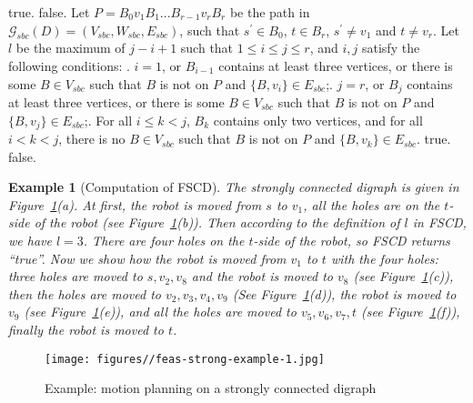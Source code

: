 \documentclass{article}
\newtheorem{exmp}[thm]{Example}
\begin{document}
\begin{algorithm}[ht]
{
{\Return true.}
{\Return false.}\;
}
{
Let $P=B_0v_1B_1...B_{r-1}v_rB_r$ be the path in
  $\mathcal{G}_{sbc}(D)=(V_{sbc},W_{sbc},E_{sbc})$, such that $s^\prime \in
  B_0$, $t \in B_r$, $s^\prime \neq v_1$ and $t \neq v_r$.\;
Let $l$ be the maximum of $j-i+1$ such that $1 \le i \le j \le r$, and
  $i,j$ satisfy the following conditions:\;
. $i=1$, or $B_{i-1}$ contains at least three vertices, or
  there is some $B \in V_{sbc}$ such that $B$ is not on $P$ and $\{B,v_i\} \in E_{sbc}$;. $j=r$, or $B_j$ contains at least three vertices, or there is
  some $B \in V_{sbc}$ such that $B$ is not on $P$ and $\{B,v_j\} \in E_{sbc}$;. For all $i \le k < j$, $B_{k}$ contains only two vertices, and
  for all $i < k < j$, there is no $B \in V_{sbc}$ such that $B$ is
  not on $P$ and $\{B,v_k\} \in E_{sbc}$.\;
\Indm {}
{\Return true.}
{\Return false.}\;
}
\caption{FSCD($D,s,t,f$)\label{Alg:feas-strong}}
\end{algorithm}
\clearpage

\begin{exmp}[Computation of FSCD]
The strongly connected digraph is given in
Figure~\ref{fig:feas-strong-example-1}(a). At first, the robot is
moved from $s$ to $v_1$, all the holes are on the $t$-side of the
robot (see Figure~\ref{fig:feas-strong-example-1}(b)). Then
according to the definition of $l$ in FSCD, we have $l=3$. There are
four holes on the $t$-side of the robot, so FSCD returns ``true''.
Now we show how the robot is moved from $v_1$ to $t$ with the four
holes: three holes are moved to $s,v_2,v_8$ and the robot is moved
to $v_8$ (see Figure~\ref{fig:feas-strong-example-1}(c)), then the
holes are moved to $v_2,v_3,v_4,v_9$ (See
Figure~\ref{fig:feas-strong-example-1}(d)), the robot is moved to
$v_9$ (see Figure~\ref{fig:feas-strong-example-1}(e)), and all the
holes are moved to $v_5,v_6,v_7,t$ (see
Figure~\ref{fig:feas-strong-example-1}(f)), finally the robot is
moved to $t$.
\end{exmp}

\begin{figure}[ht]
\centering
  \texttt{[image: figures//feas-strong-example-1.jpg]}
  \caption{Example: motion planning on a strongly connected digraph}\label{fig:feas-strong-example-1}
\end{figure}
\end{document}
